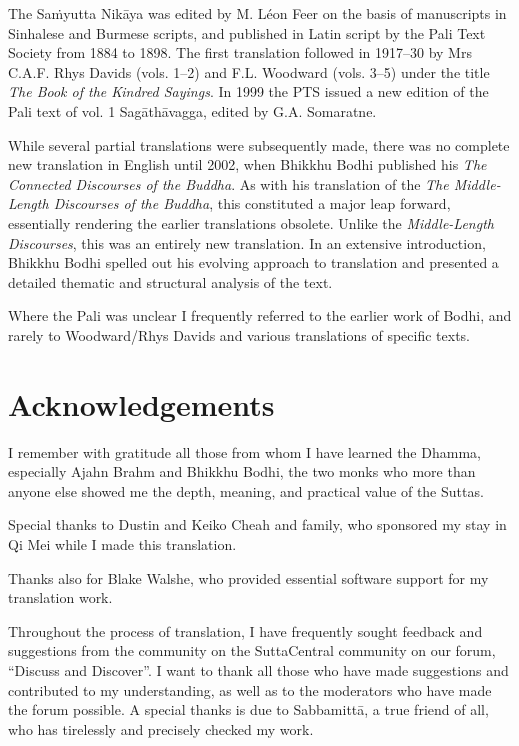 \documentclass[12pt,openany]{book}%
\begin{document}
The \textsanskrit{Saṁyutta} \textsanskrit{Nikāya} was edited by M. Léon Feer on the basis of manuscripts in Sinhalese and Burmese scripts, and published in Latin script by the Pali Text Society from 1884 to 1898. The first translation followed in 1917–30 by Mrs C.A.F. Rhys Davids (vols. 1–2) and F.L. Woodward (vols. 3–5) under the title \textit{The Book of the Kindred Sayings}. In 1999 the PTS issued a new edition of the Pali text of vol. 1 \textsanskrit{Sagāthāvagga}, edited by G.A. Somaratne.

While several partial translations were subsequently made, there was no complete new translation in English until 2002, when Bhikkhu Bodhi published his \textit{The Connected Discourses of the Buddha}. As with his translation of the \textit{The Middle-Length Discourses of the Buddha}, this constituted a major leap forward, essentially rendering the earlier translations obsolete. Unlike the \textit{Middle-Length Discourses}, this was an entirely new translation. In an extensive introduction, Bhikkhu Bodhi spelled out his evolving approach to translation and presented a detailed thematic and structural analysis of the text.

Where the Pali was unclear I frequently referred to the earlier work of Bodhi, and rarely to Woodward/Rhys Davids and various translations of specific texts.

%
\chapter*{Acknowledgements}

I remember with gratitude all those from whom I have learned the Dhamma, especially Ajahn Brahm and Bhikkhu Bodhi, the two monks who more than anyone else showed me the depth, meaning, and practical value of the Suttas.

Special thanks to Dustin and Keiko Cheah and family, who sponsored my stay in Qi Mei while I made this translation.

Thanks also for Blake Walshe, who provided essential software support for my translation work.

Throughout the process of translation, I have frequently sought feedback and suggestions from the community on the SuttaCentral community on our forum, “Discuss and Discover”. I want to thank all those who have made suggestions and contributed to my understanding, as well as to the moderators who have made the forum possible. A special thanks is due to \textsanskrit{Sabbamittā}, a true friend of all, who has tirelessly and precisely checked my work.
\end{document}
